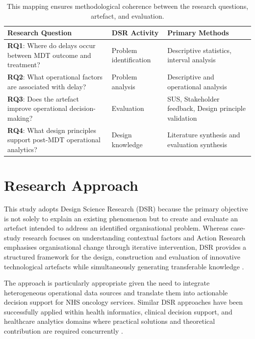 \begin{table}[h]
    \centering
    \begin{tabular}{|p{5cm}|p{5cm}|p{5cm}|}
        \hline
        \textbf{Research Question} & \textbf{DSR Activity} & \textbf{Primary Methods} \\
        \hline\hline
        \textbf{RQ1}: Where do delays occur between MDT outcome and treatment? & Problem identification & Descriptive statistics, interval analysis \\
        \hline
        \textbf{RQ2}: What operational factors are associated with delay? & Problem analysis & Descriptive and operational analysis\\
        \hline
        \textbf{RQ3}: Does the artefact improve operational decision-making? & Evaluation & SUS, Stakeholder feedback, Design principle validation\\
        \hline
        \textbf{RQ4}: What design principles support post-MDT operational analytics? & Design knowledge & Literature synthesis and evaluation synthesis\\
        \hline
    \end{tabular}
    \caption{This mapping ensures methodological coherence between the research questions, artefact, and evaluation.}
    \label{tab:rq-dsr-mapping}
\end{table}

\section{Research Approach}

This study adopts Design Science Research (DSR) because the primary objective is not solely to explain an existing phenomenon but to create and evaluate an artefact intended to address an identified organisational problem. Whereas case-study research focuses on understanding contextual factors and Action Research emphasises organisational change through iterative intervention, DSR provides a structured framework for the design, construction and evaluation of innovative technological artefacts while simultaneously generating transferable knowledge \citep{hevner2004, peffers2007}.

The approach is particularly appropriate given the need to integrate heterogeneous operational data sources and translate them into actionable decision support for NHS oncology services. Similar DSR approaches have been successfully applied within health informatics, clinical decision support, and healthcare analytics domains where practical solutions and theoretical contribution are required concurrently \citep{harper2023, johnson2020}.

